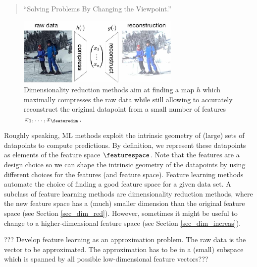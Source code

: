 \documentclass[12pt]{report}
\begin{document}
\begin{quote}
``Solving Problems By Changing the Viewpoint.''
\end{quote}

\begin{figure}[htbp]
\begin{center}
\includegraphics[width=0.7\textwidth]{DimRed.jpg}  
\end{center}
\caption{Dimensionality reduction methods aim at finding a map $h$ which maximally 
	compresses the raw data while still allowing to accurately reconstruct the original 
	datapoint from a small number of features $x_{1},\ldots,x_{\featuredim}$.}
\label{fig_dimred}
\end{figure}



Roughly speaking, ML methods exploit the intrinsic geometry of (large) sets of 
datapoints to compute predictions. By definition, we represent these datapoints 
as elements of the feature space $\featurespace$. Note that the features are 
a design choice so we can shape the intrinsic geometry of the datapoints by 
using different choices for the features (and feature space). Feature learning 
methods automate the choice of finding a good feature space for a given 
data set. A subclass of feature learning methods are dimensionality reduction methods, 
where the new feature space has a (much) smaller dimension than the original 
feature space (see Section \ref{sec_dim_red}). However, sometimes it might be 
useful to change to a higher-dimensional feature space (see Section \ref{sec_dim_increas}). 


??? Develop feature learning as an approximation problem. The raw data 
is the vector to be approximated. The approximation has to be in a (small) 
subspace which is spanned by all possible low-dimensional feature vectors???

\end{document}
